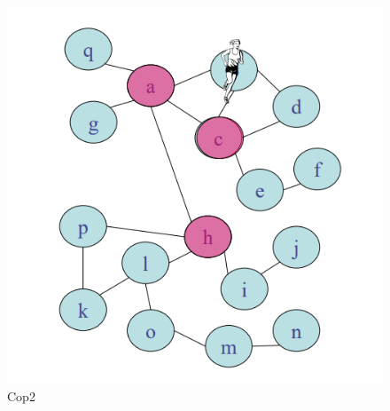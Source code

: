 \begin{figure}[H]
\begin{minipage}[b]{0.45\linewidth}
        \includegraphics[width=\linewidth]{chapters/images/cop2.png}
        \caption{Cop2}
        \label{fig:6}
    \end{minipage}
\end{figure}


